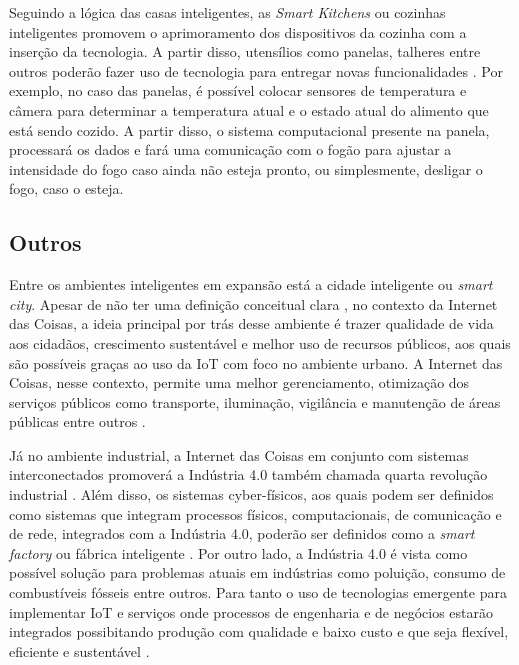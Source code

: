 
Seguindo a lógica das casas inteligentes, as \textit{Smart Kitchens} ou cozinhas inteligentes promovem o aprimoramento dos dispositivos da cozinha com a inserção da tecnologia. A partir disso, utensílios como panelas, talheres entre outros poderão fazer uso de tecnologia para entregar novas funcionalidades \cite{Staender2012}. Por exemplo, no caso das panelas, é possível colocar sensores de temperatura e câmera para determinar a temperatura atual e o estado atual do alimento que está sendo cozido. A partir disso, o sistema computacional presente na panela, processará os dados e fará uma comunicação com o fogão para ajustar a intensidade do fogo caso ainda não esteja pronto, ou simplesmente, desligar o fogo, caso o esteja. 

\subsection{Outros}





Entre os ambientes inteligentes em expansão está a cidade inteligente ou \textit{smart city}. Apesar de não ter uma definição conceitual clara \cite{Cocchia2014}, no contexto da Internet das Coisas, a ideia principal por trás desse ambiente é trazer qualidade de vida aos cidadãos, crescimento sustentável e melhor uso de recursos públicos, aos quais são possíveis graças ao uso da IoT com foco no ambiente urbano. A Internet das Coisas, nesse contexto, permite uma melhor gerenciamento, otimização dos serviços públicos como transporte, iluminação, vigilância e manutenção de áreas públicas entre outros  \cite{Zanella2014}. 

%
Já no ambiente industrial, a Internet das Coisas em conjunto com sistemas interconectados promoverá a Indústria 4.0 também chamada quarta revolução industrial . Além disso, os sistemas cyber-físicos, aos quais podem ser definidos como sistemas que integram processos físicos, computacionais, de comunicação e de rede, integrados com a Indústria 4.0, poderão ser definidos como a \textit{smart factory} ou fábrica inteligente \cite{Lee2015}. Por outro lado, a Indústria 4.0 é vista como possível solução para problemas atuais em indústrias como poluição, consumo de combustíveis fósseis entre outros. Para tanto o uso de tecnologias emergente para implementar IoT e serviços onde processos de engenharia e de negócios estarão integrados possibitando produção com qualidade e baixo custo e que seja flexível, eficiente e sustentável \cite{Hussain2016}.


